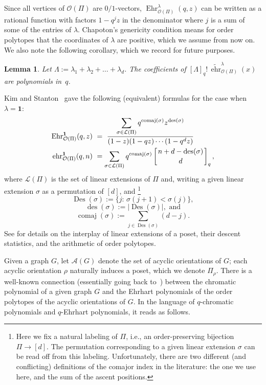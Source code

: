 \documentclass[11pt]{amsart}
\newtheorem{lemma}[theorem]{Lemma}
\newcommand\ehr{\operatorname{ehr}}
\newcommand\Ehr{\operatorname{Ehr}}
\newcommand\Des{\operatorname{Des}}
\newcommand\des{\operatorname{des}}
\newcommand\comaj{\operatorname{comaj}}
\newcommand\bone{\mathbf{1}}
\begin{document}
Since all vertices of $\mathcal{O}(\Pi)$ are $0/1$-vectors, $\Ehr^\lambda_{\mathcal{O}(\Pi)}(q,z)$ can be written as a rational function with factors $1 - q^j z$ in the denominator where $j$ is a sum of some of the entries of $\lambda$. 
Chapoton's genericity condition means for order polytopes that the coordinates of $\lambda$
are positive, which we assume from now on.
We also note the following corollary, which we record for future purposes.

\begin{lemma}\label{lem:ehrpolcoeff}
Let $\Lambda := \lambda_1 + \lambda_2 + \dots + \lambda_d$.
The coefficients of $[\Lambda]_q! \, \widetilde{\ehr}^\lambda_{\mathcal{O}(\Pi)}(x)$ are polynomials in~$q$.
\end{lemma}
 
Kim and Stanton~\cite[Corollary~9.7]{KimStanton} gave the following (equivalent) formulas for the case when $\lambda = \bone$:
\begin{align}
\Ehr^\bone_{\mathcal{O}(\Pi)}(q,z) \ &= \ 
\frac{\displaystyle \sum_{\sigma\in\mathcal{L}(\Pi)}
q^{\comaj(\sigma)}z^{\des(\sigma)}}{(1-z)(1-qz)\cdots(1-q^dz)} \nonumber \\
\ehr^\bone_{\mathcal{O}(\Pi)}(q,n)\ &= \sum_{\sigma\in \mathcal{L}(\Pi)}
q^{\comaj(\sigma)}\left[{n+d-\des(\sigma) \atop d}\right]_q, \label{eq:kimstanton}
\end{align}
where $\mathcal{L}(\Pi)$ is the set of linear extensions of $\Pi$ and, writing a given linear extension $\sigma$ as a permutation of $[d]$, and \footnote{Here we fix a natural labeling of $\Pi$, i.e., an order-preserving bijection $\Pi \to [d]$.
The permutation corresponding to a given linear extension $\sigma$ can be read off from this labeling. 
Unfortunately, there are two different (and conflicting) definitions of the comajor index in the literature: the one we use here, and the sum of the ascent positions.
}
\[\Des(\sigma) := \{ j : \, \sigma(j+1) < \sigma(j) \},\]
\[\des(\sigma) := |\Des(\sigma)|, \text{ and}\]
\[\comaj(\sigma) := \sum_{j\in\Des(\sigma)}(d-j).\]
See \cite[Chapter 6]{CRT} for details on the interplay of linear extensions of a poset, their descent statistics, and the arithmetic of order polytopes.

Given a graph $G$, let $\mathcal{A}(G)$ denote the set of acyclic orientations of $G$; each acyclic orientation $\rho$ naturally induces a poset, which we denote $\Pi_\rho$.
There is a well-known connection (essentially going back to~\cite{stanleyacyclic}) between the chromatic polynomial of a given graph $G$ and the Ehrhart polynomials of the order polytopes of the acyclic orientations of $G$. 
In the language of $q$-chromatic polynomials and $q$-Ehrhart polynomials, it reads as follows.
\end{document}
